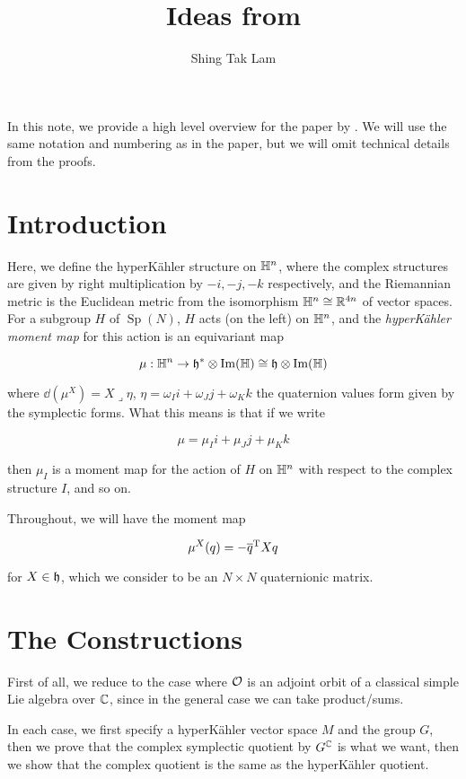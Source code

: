 \documentclass{article}
\title{Ideas from \citetitle{kobak_classical_1996}}
\author{Shing Tak Lam}
\DeclareMathOperator{\Sp}{Sp}
\begin{document}
\maketitle

In this note, we provide a high level overview for the paper \cite{kobak_classical_1996} by \citeauthor{kobak_classical_1996}. We will use the same notation and numbering as in the paper, but we will omit technical details from the proofs.

\section{Introduction}

Here, we define the hyperK\"ahler structure on \(\mathbb{H}^n\), where the complex structures are given by right multiplication by \(-i, -j, -k\) respectively, and the Riemannian metric is the Euclidean metric from the isomorphism \(\mathbb{H}^n \cong \mathbb{R}^{4n}\) of vector spaces. For a subgroup \(H\) of \(\Sp(N)\), \(H\) acts (on the left) on \(\mathbb{H}^n\), and the \emph{hyperK\"ahler moment map} for this action is an equivariant map

\[\mu : \mathbb{H}^n \to \mathfrak{h}^* \otimes \Im(\mathbb{H}) \cong \mathfrak{h} \otimes \Im(\mathbb{H})\]

where \(\dd(\mu^X) = X\lrcorner \eta\), \(\eta = \omega_I i + \omega_J j + \omega_K k\) the quaternion values form given by the symplectic forms. What this means is that if we write

\[\mu = \mu_I i + \mu_J j + \mu_K k\]

then \(\mu_I\) is a moment map for the action of \(H\) on \(\mathbb{H}^n\) with respect to the complex structure \(I\), and so on.

Throughout, we will have the moment map

\[\mu^X(q) = -\overline q^{\mathrm{T}} X q\]

for \(X \in \mathfrak{h}\), which we consider to be an \(N \times N\) quaternionic matrix.

\section{The Constructions}

First of all, we reduce to the case where \(\mathcal{O}\) is an adjoint orbit of a classical simple Lie algebra over \(\mathbb{C}\), since in the general case we can take product/sums.

In each case, we first specify a hyperK\"ahler vector space \(M\) and the group \(G\), then we prove that the complex symplectic quotient by \(G^{\mathbb{C}}\) is what we want, then we show that the complex quotient is the same as the hyperK\"ahler quotient.
\end{document}
